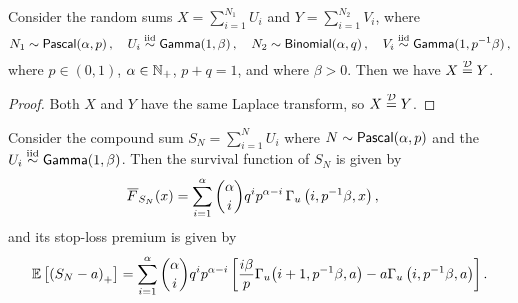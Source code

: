 \begin{lemma} \label{lemma:BinomialPascalEquivalence}
Consider the random sums $X = \sum_{i=1}^{N_1} U_i$ and $Y = \sum_{i=1}^{N_2} V_i$, where
\[
N_1 \sim \mathsf{Pascal}(\alpha,p) \,, \quad  U_i \overset{\smash{\mathrm{iid}}}{\sim} \mathsf{Gamma}(1,\beta) \,, \quad  N_2 \sim \mathsf{Binomial}(\alpha,q)  \,, \quad V_i \overset{\smash{\mathrm{iid}}}{\sim} \mathsf{Gamma}(1,p^{-1} \beta) \,,
\]
where $p \in (0,1)$, $\alpha \in \mathbb{N}_+$, $p + q = 1$, and where $\beta > 0$.
Then we have $X \stackrel{\smash{\mathcal{D}}}{=} Y$.
\end{lemma}
\begin{proof}
Both $X$ and $Y$ have the same Laplace transform, so $X \stackrel{\smash{\mathcal{D}}}{=} Y$.
\end{proof}

\begin{corollary} \label{Coro:PascalExponentialStopLoss}
Consider the compound sum $S_N = \sum_{i=1}^N U_i$ where $N \sim \mathsf{Pascal}(\alpha,p)$ and the $U_i \overset{\smash{\mathrm{iid}}}{\sim}\mathsf{Gamma}(1,\beta)$.
Then the survival function of $S_N$ is given by
\begin{align*}
\Ftail_{S_N}(x) &= \sum_{i=1}^\alpha \binom{\alpha}{i} q^i p^{\alpha-i} \, \Gamma_u\left(i, p^{-1}\beta, x\right),
\end{align*}
and its stop-loss premium is given by
\begin{equation*}\label{eq:StopLossCompoundNegBinExp}
\operatorname{{\mathbb E}}\left[\left(S_N-a\right)_{+}\right] = \sum_{i=1}^\alpha \binom{\alpha}{i} q^i p^{\alpha-i} \left[ \frac{i\beta}{p } \Gamma_u\big(i+1, p^{-1} \beta , a \big) - a \Gamma_u\left(i, p^{-1}\beta , a\right) \right].
\end{equation*}
\end{corollary}
